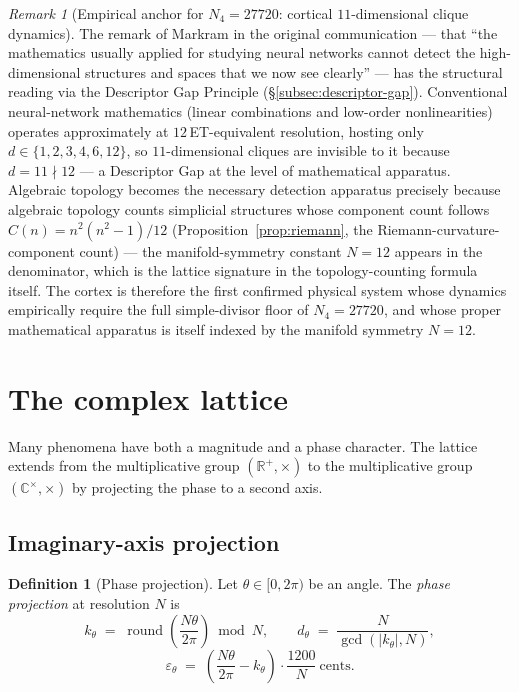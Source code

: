 \documentclass[11pt,a4paper]{article}
\theoremstyle{definition}
\newtheorem{definition}[theorem]{Definition}
\theoremstyle{remark}
\newtheorem{remark}[theorem]{Remark}
\newcommand{\R}{\mathbb{R}}
\newcommand{\C}{\mathbb{C}}
\DeclareMathOperator{\round}{round}
\newcommand{\eps}{\varepsilon}
\begin{document}
\begin{remark}[Empirical anchor for $N_{4}=27720$: cortical $11$-dimensional clique dynamics]
The remark of Markram in the original communication --- that ``the mathematics usually applied for studying neural networks cannot detect the high-dimensional structures and spaces that we now see clearly'' --- has the structural reading via the Descriptor Gap Principle (\S\ref{subsec:descriptor-gap}). Conventional neural-network mathematics (linear combinations and low-order nonlinearities) operates approximately at $12$\,ET-equivalent resolution, hosting only $d \in \{1,2,3,4,6,12\}$, so $11$-dimensional cliques are invisible to it because $d=11 \nmid 12$ --- a Descriptor Gap at the level of mathematical apparatus. Algebraic topology becomes the necessary detection apparatus precisely because algebraic topology counts simplicial structures whose component count follows $C(n) = n^{2}(n^{2}-1)/12$ (Proposition~\ref{prop:riemann}, the Riemann-curvature-component count) --- the manifold-symmetry constant $N=12$ appears in the denominator, which is the lattice signature in the topology-counting formula itself. The cortex is therefore the first confirmed physical system whose dynamics empirically require the full simple-divisor floor of $N_{4}=27720$, and whose proper mathematical apparatus is itself indexed by the manifold symmetry $N=12$.
\end{remark}

\section{The complex lattice}\label{sec:complex}

Many phenomena have both a magnitude and a phase character. The lattice extends from the multiplicative group $(\R^{+},\times)$ to the multiplicative group $(\C^{\times},\times)$ by projecting the phase to a second axis.

\subsection{Imaginary-axis projection}

\begin{definition}[Phase projection]\label{def:phase}
Let $\theta\in[0,2\pi)$ be an angle. The \emph{phase projection} at resolution $N$ is
\[
k_{\theta} \;=\; \round\!\left(\frac{N\theta}{2\pi}\right)\bmod N, \qquad d_{\theta} \;=\; \frac{N}{\gcd(|k_{\theta}|,N)},
\]
\[
\eps_{\theta} \;=\; \left(\frac{N\theta}{2\pi}-k_{\theta}\right)\cdot\frac{1200}{N}\ \text{cents}.
\]
\end{definition}
\end{document}
